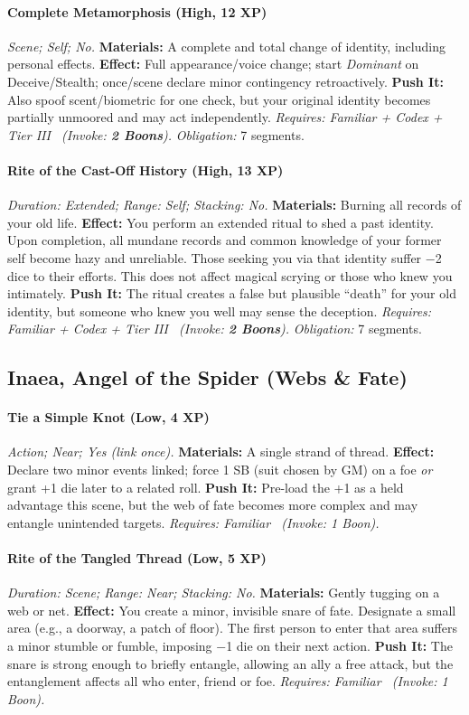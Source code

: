 \paragraph{Complete Metamorphosis (High, 12 XP)} \emph{Scene; Self; No.}
\textbf{Materials:} A complete and total change of identity, including personal effects.
\textbf{Effect:} Full appearance/voice change; start \emph{Dominant} on Deceive/Stealth; once/scene declare minor contingency retroactively.
\textbf{Push It:} Also spoof scent/biometric for one check, but your original identity becomes partially unmoored and may act independently.
\emph{Requires: Familiar + Codex + Tier III \ (\textit{Invoke:} \textbf{2 Boons}).}
\emph{Obligation:} 7 segments.

\paragraph{Rite of the Cast-Off History (High, 13 XP)} \emph{Duration: Extended; Range: Self; Stacking: No.}
\textbf{Materials:} Burning all records of your old life.
\textbf{Effect:} You perform an extended ritual to shed a past identity. Upon completion, all mundane records and common knowledge of your former self become hazy and unreliable. Those seeking you via that identity suffer −2 dice to their efforts. This does not affect magical scrying or those who knew you intimately.
\textbf{Push It:} The ritual creates a false but plausible ``death'' for your old identity, but someone who knew you well may sense the deception.
\emph{Requires: Familiar + Codex + Tier III \ (\textit{Invoke:} \textbf{2 Boons}).}
\emph{Obligation:} 7 segments.

\subsection{Inaea, Angel of the Spider (Webs \& Fate)}
\paragraph{Tie a Simple Knot (Low, 4 XP)} \emph{Action; Near; Yes (link once).}
\textbf{Materials:} A single strand of thread.
\textbf{Effect:} Declare two minor events linked; force 1 SB (suit chosen by GM) on a foe \emph{or} grant +1 die later to a related roll.
\textbf{Push It:} Pre-load the +1 as a held advantage this scene, but the web of fate becomes more complex and may entangle unintended targets.
\emph{Requires: Familiar \ (\textit{Invoke:} 1 Boon).}
\paragraph{Rite of the Tangled Thread (Low, 5 XP)} \emph{Duration: Scene; Range: Near; Stacking: No.}
\textbf{Materials:} Gently tugging on a web or net.
\textbf{Effect:} You create a minor, invisible snare of fate. Designate a small area (e.g., a doorway, a patch of floor). The first person to enter that area suffers a minor stumble or fumble, imposing −1 die on their next action.
\textbf{Push It:} The snare is strong enough to briefly entangle, allowing an ally a free attack, but the entanglement affects all who enter, friend or foe.
\emph{Requires: Familiar \ (\textit{Invoke:} 1 Boon).}

